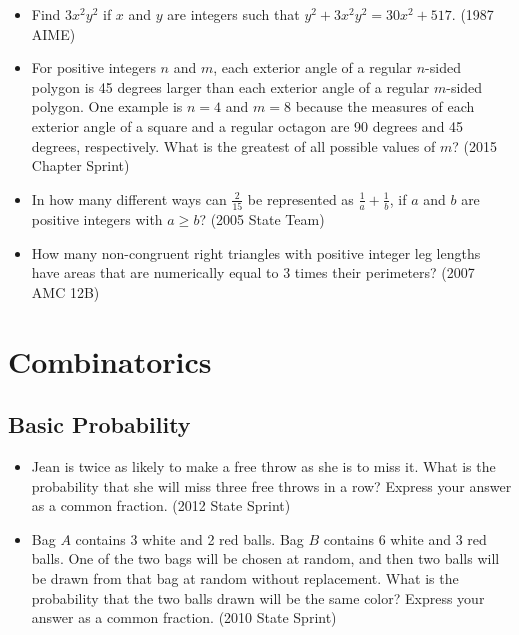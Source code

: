 \documentclass{article}
\begin{document}
\begin{itemize}
\item Find $3x^2y^2$ if $x$ and $y$ are integers such that $y^2+3x^2y^2=30x^2+517$. (1987 AIME)

\item For positive integers $n$ and $m$, each exterior angle of a regular $n$-sided polygon is 45 degrees larger than each exterior angle of a regular $m$-sided polygon. One example is $n=4$ and $m=8$ because the measures of each exterior angle of a square and a regular octagon are 90 degrees and 45 degrees, respectively. What is the greatest of all possible values of $m$? (2015 Chapter Sprint)

\item In how many different ways can $\frac{2}{15}$ be represented as $\frac{1}{a}+\frac{1}{b}$, if $a$ and $b$ are positive integers with $a\ge b$? (2005 State Team)

\item How many non-congruent right triangles with positive integer leg lengths have areas that are numerically equal to $3$ times their perimeters? (2007 AMC 12B)

\end{itemize}



\section{Combinatorics}

\subsection{Basic Probability}

\begin{itemize}

\item Jean is twice as likely to make a free throw as she is to miss it. What is the probability that she will miss three free throws in a row? Express your answer as a common fraction. (2012 State Sprint)

\item Bag $A$ contains 3 white and 2 red balls. Bag $B$ contains 6 white and 3 red balls. One of the two bags will be chosen at random, and then two balls will be drawn from that bag at random without replacement. What is the probability that the two balls drawn will be the same color? Express your answer as a common fraction. (2010 State Sprint)


\end{itemize}
\end{document}
